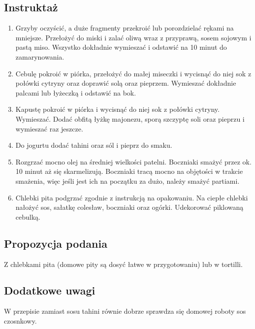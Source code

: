 \vspace{0.5cm}

\subsection*{Instruktaż}
\begin{enumerate}
    \item Grzyby oczyścić, a duże fragmenty przekroić lub porozdzielać rękami na mniejsze. Przełożyć do miski i zalać oliwą wraz z przyprawą, sosem sojowym i pastą miso. Wszystko dokładnie wymieszać i odstawić na 10 minut do zamarynowania.
    \item Cebulę pokroić w piórka, przełożyć do małej miseczki i wycisnąć do niej sok z połówki cytryny oraz doprawić solą oraz pieprzem. Wymieszać dokładnie palcami lub łyżeczką i odstawić na bok.
    \item Kapustę pokroić w piórka i wycisnąć do niej sok z połówki cytryny. Wymieszać. Dodać obfitą łyżkę majonezu, sporą szczyptę soli oraz pieprzu i wymieszać raz jeszcze.
    \item Do jogurtu dodać tahini oraz sól i pieprz do smaku.
    \item Rozgrzać mocno olej na średniej wielkości patelni. Boczniaki smażyć przez ok. 10 minut aż się skarmelizują. Boczniaki tracą mocno na objętości w trakcie smażenia, więc jeśli jest ich na początku za dużo, należy smażyć partiami.
    \item Chlebki pita podgrzać zgodnie z instrukcją na opakowaniu. Na ciepłe chlebki nałożyć sos, sałatkę colesław, boczniaki oraz ogórki. Udekorować piklowaną cebulką.
\end{enumerate}

\vspace{0.5cm}

\small
\subsection*{Propozycja podania}
Z chlebkami pita (domowe pity są dosyć łatwe w przygotowaniu) lub w tortilli.

\vspace{0.3cm}

\subsection*{Dodatkowe uwagi} W przepisie zamiast sosu tahini równie dobrze sprawdza się domowej roboty sos czosnkowy.
